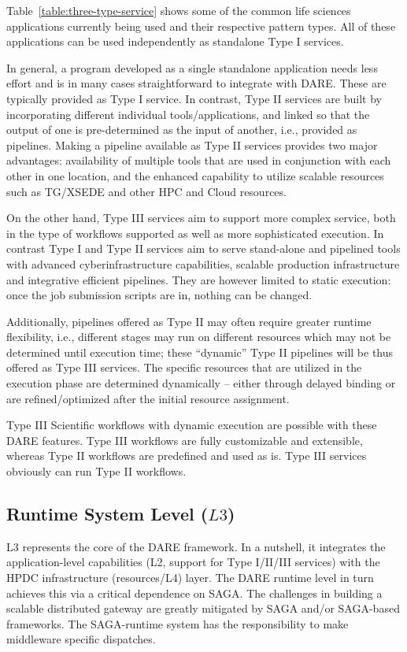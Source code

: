 \documentclass[]{svjour3}
\begin{document}
Table~\ref{table:three-type-service} shows some of the common life sciences
applications currently being used and their respective pattern types. All
of these applications can be used independently as standalone Type I services.

In general, a program developed as a single standalone application needs
less effort and is in many cases straightforward to integrate with
DARE. These are typically provided as Type I service. In contrast,
Type II services are built by incorporating different individual
tools/applications, and linked so that the output of one is
pre-determined as the input of another, i.e., provided as pipelines.
Making a pipeline available as Type II services provides
two major advantages: availability of multiple tools that are used in
conjunction with each other in one location, and the enhanced
capability to utilize scalable resources such as TG/XSEDE and other
HPC and Cloud resources.

On the other hand, Type III services aim to support more complex
service, both in the type of workflows supported as well as more
sophisticated execution. In contrast Type I and Type II
services aim to serve stand-alone and pipelined tools with
advanced cyberinfrastructure capabilities, scalable production infrastructure and
integrative efficient pipelines. They are however limited to static execution:
once the job submission scripts are in, nothing can be changed.

Additionally, pipelines offered as Type II may often require greater
runtime flexibility, i.e., different stages may run on different
resources which may not be determined until execution time; these
``dynamic'' Type II pipelines will be thus offered as Type III
services. The specific resources that are utilized in the
execution phase are determined dynamically -- either through delayed
binding or are refined/optimized after the initial resource
assignment.

Type III Scientific workflows with dynamic execution are possible with
these DARE features. Type III workflows are fully customizable and
extensible, whereas Type II workflows are predefined and used as is.
Type III services obviously can run Type II workflows.



\subsection{Runtime System Level ($L3$)}

L3 represents the core of the DARE framework. In a nutshell, it
integrates the application-level capabilities (L2, support for Type
I/II/III services) with the HPDC infrastructure (resources/L4) layer. The DARE
runtime level in turn achieves this via a critical dependence on
SAGA. The challenges in building a scalable distributed gateway are
greatly mitigated by SAGA and/or SAGA-based frameworks. The
SAGA-runtime system has the responsibility to make middleware specific
dispatches.
\end{document}
